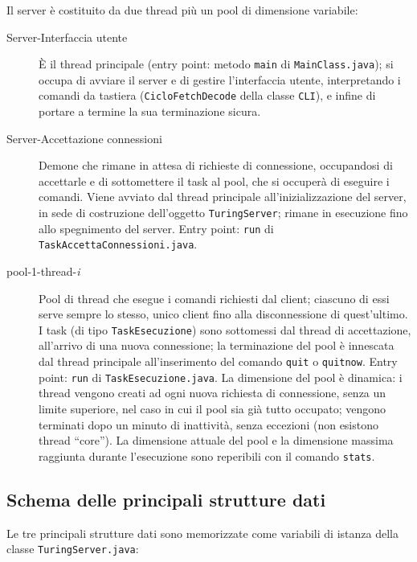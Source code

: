 \documentclass[a4paper,12pt]{article}
\begin{document}
 Il server è costituito da due thread più un pool di dimensione variabile:
 \begin{description}
  \item[Server-Interfaccia utente] \`E il thread principale (entry point: metodo \texttt{main} di \texttt{MainClass.java}); si occupa di avviare il server e di gestire l'interfaccia utente, interpretando i comandi da tastiera (\texttt{CicloFetchDecode} della classe \texttt{CLI}), e infine di portare a termine la sua terminazione sicura.
  
  \item[Server-Accettazione connessioni] Demone che rimane in attesa di richieste di connessione, occupandosi di accettarle e di sottomettere il task al pool, che si occuperà di eseguire i comandi. Viene avviato dal thread principale all'inizializzazione del server, in sede di costruzione dell'oggetto \texttt{TuringServer}; rimane in esecuzione fino allo spegnimento del server. Entry point: \texttt{run} di \texttt{TaskAccettaConnessioni.java}.
  
  \item[pool-1-thread-\textit{i}] Pool di thread che esegue i comandi richiesti dal client; ciascuno di essi serve sempre lo stesso, unico client fino alla disconnessione di quest'ultimo. I task (di tipo \texttt{TaskEsecuzione}) sono sottomessi dal thread di accettazione, all'arrivo di una nuova connessione; la terminazione del pool è innescata dal thread principale all'inserimento del comando \texttt{quit} o \texttt{quitnow}. Entry point: \texttt{run} di \texttt{TaskEsecuzione.java}. La dimensione del pool è dinamica: i thread vengono creati ad ogni nuova richiesta di connessione, senza un limite superiore, nel caso in cui il pool sia già tutto occupato; vengono terminati dopo un minuto di inattività, senza eccezioni (non esistono thread ``core''). La dimensione attuale del pool e la dimensione massima raggiunta durante l'esecuzione sono reperibili con il comando \texttt{stats}.
 \end{description}
 
 \subsection{ Schema delle principali strutture dati }
 
 Le tre principali strutture dati sono memorizzate come variabili di istanza della classe \texttt{TuringServer.java}:
 
\end{document}
